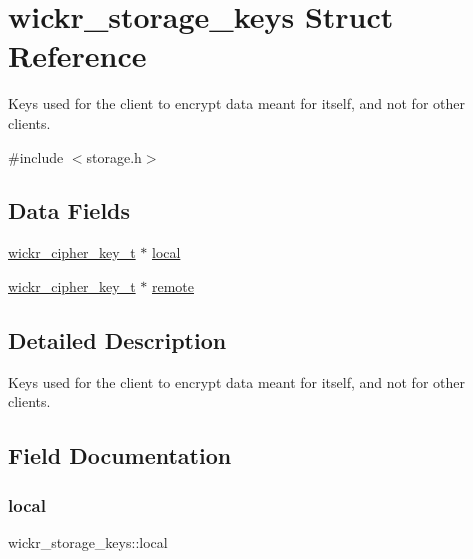 \hypertarget{structwickr__storage__keys}{}\section{wickr\+\_\+storage\+\_\+keys Struct Reference}
\label{structwickr__storage__keys}


Key\textquotesingle{}s used for the client to encrypt data meant for itself, and not for other clients.  




{\ttfamily \#include $<$storage.\+h$>$}

\subsection*{Data Fields}
\begin{DoxyCompactItemize}
\item 
\mbox{\hyperlink{structwickr__cipher__key}{wickr\+\_\+cipher\+\_\+key\+\_\+t}} $\ast$ \mbox{\hyperlink{structwickr__storage__keys_a544b35d7a75bd6076f6c34537e49ef6b}{local}}
\item 
\mbox{\hyperlink{structwickr__cipher__key}{wickr\+\_\+cipher\+\_\+key\+\_\+t}} $\ast$ \mbox{\hyperlink{structwickr__storage__keys_a44b6a0b14bcc877cb6799265b060cb28}{remote}}
\end{DoxyCompactItemize}


\subsection{Detailed Description}
Key\textquotesingle{}s used for the client to encrypt data meant for itself, and not for other clients. 

\subsection{Field Documentation}
\mbox{\label{structwickr__storage__keys_a544b35d7a75bd6076f6c34537e49ef6b}} 
\subsubsection{\texorpdfstring{local}{local}}
{\footnotesize\ttfamily wickr\+\_\+storage\+\_\+keys\+::local}

